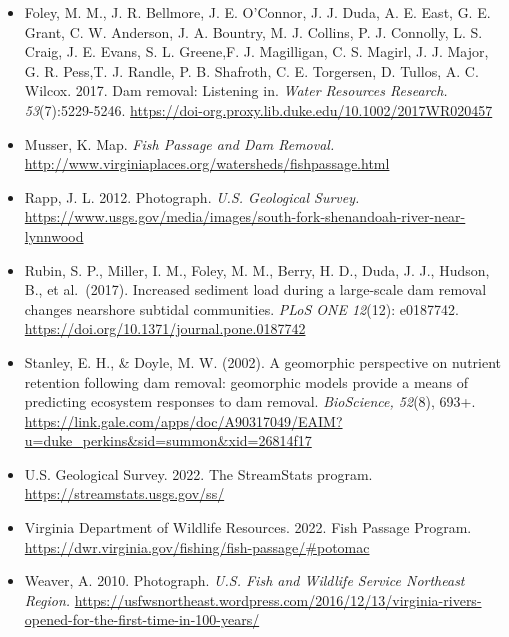 \documentclass[
  12pt,
]{article}
\begin{document}
\begin{itemize}
\item
  Foley, M. M., J. R. Bellmore, J. E. O'Connor, J. J. Duda, A. E. East,
  G. E. Grant, C. W. Anderson, J. A. Bountry, M. J. Collins, P. J.
  Connolly, L. S. Craig, J. E. Evans, S. L. Greene,F. J. Magilligan, C.
  S. Magirl, J. J. Major, G. R. Pess,T. J. Randle, P. B. Shafroth, C. E.
  Torgersen, D. Tullos, A. C. Wilcox. 2017. Dam removal: Listening in.
  \emph{Water Resources Research. 53}(7):5229-5246.
  \url{https://doi-org.proxy.lib.duke.edu/10.1002/2017WR020457}
\item
  Musser, K. Map. \emph{Fish Passage and Dam Removal.}
  \url{http://www.virginiaplaces.org/watersheds/fishpassage.html}
\item
  Rapp, J. L. 2012. Photograph. \emph{U.S. Geological Survey.}
  \url{https://www.usgs.gov/media/images/south-fork-shenandoah-river-near-lynnwood}
\item
  Rubin, S. P., Miller, I. M., Foley, M. M., Berry, H. D., Duda, J. J.,
  Hudson, B., et al.~(2017). Increased sediment load during a
  large-scale dam removal changes nearshore subtidal communities.
  \emph{PLoS ONE 12}(12): e0187742.
  \url{https://doi.org/10.1371/journal.pone.0187742}
\item
  Stanley, E. H., \& Doyle, M. W. (2002). A geomorphic perspective on
  nutrient retention following dam removal: geomorphic models provide a
  means of predicting ecosystem responses to dam removal.
  \emph{BioScience, 52}(8), 693+.
  \url{https://link.gale.com/apps/doc/A90317049/EAIM?u=duke_perkins\&sid=summon\&xid=26814f17}
\item
  U.S. Geological Survey. 2022. The StreamStats program.
  \url{https://streamstats.usgs.gov/ss/}
\item
  Virginia Department of Wildlife Resources. 2022. Fish Passage Program.
  \url{https://dwr.virginia.gov/fishing/fish-passage/\#potomac}
\item
  Weaver, A. 2010. Photograph. \emph{U.S. Fish and Wildlife Service
  Northeast Region.}
  \url{https://usfwsnortheast.wordpress.com/2016/12/13/virginia-rivers-opened-for-the-first-time-in-100-years/}
\end{itemize}
\end{document}
